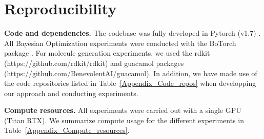 \vspace{-2mm}
\section{Reproducibility}
\vspace{-1mm}
\textbf{Code and dependencies. }
The codebase was fully developed in Pytorch (v1.7) \cite{NEURIPS2019_9015}. All Bayesian Optimization experiments were conducted with the BoTorch package \cite{balandat2020botorch}. For molecule generation experiments, we used the rdkit (https://github.com/rdkit/rdkit) and guacamol packages (https://github.com/BenevolentAI/guacamol). 
In addition, we have made use of the code repositories listed in Table~\ref{Appendix_Code_repos} when developping our approach and conducting experiments.

\begin{table}[h]
\setlength\belowcaptionskip{0.5pt}
\begin{center}
\caption{\textbf{Code repositories used}}
\label{Appendix_Code_repos}
\end{center}
\end{table}
\vspace{-2mm}
\textbf{Compute resources. } All experiments were carried out with a single GPU (Titan RTX). We summarize compute usage for the different experiments in Table~\ref{Appendix_Compute_resources}.

\begin{table}[h]
\begin{center}
\caption{\textbf{Compute usage per experiment summary}}
\label{Appendix_Compute_resources}
\end{center}
\end{table}

